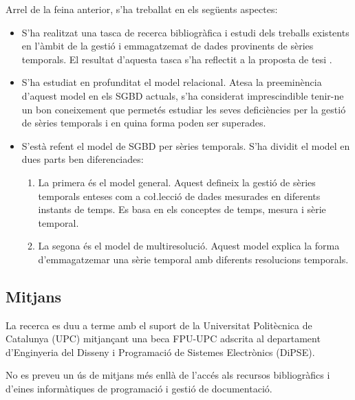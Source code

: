 Arrel de la feina anterior, s'ha treballat en els següents aspectes:
\begin{itemize}
\item S'ha realitzat una tasca de recerca bibliogràfica i estudi dels
  treballs existents en l'àmbit de la gestió i emmagatzemat de dades
  provinents de sèries temporals. El resultat d'aquesta tasca s'ha
  reflectit a la proposta de tesi \parencite{llusa12:ptd}.
\item S'ha estudiat en profunditat el model relacional. Atesa la
  preeminència d'aquest model en els SGBD actuals, s'ha considerat
  imprescindible tenir-ne un bon coneixement que permetés estudiar les
  seves deficiències per la gestió de sèries temporals i en quina
  forma poden ser superades.
\item S'està refent el model de SGBD per sèries temporals.  S'ha
  dividit el model en dues parts ben diferenciades:
  \begin{enumerate}
  \item La primera és el model general. Aquest defineix la gestió de
    sèries temporals enteses com a co\l.lecció de dades mesurades en
    diferents instants de temps. Es basa en els conceptes de temps,
    mesura i sèrie temporal.
  \item La segona és el model de multiresolució. Aquest model explica
    la forma d'emmagatzemar una sèrie temporal amb diferents
    resolucions temporals.
  \end{enumerate}
\end{itemize}





\subsection*{Mitjans}

La recerca es duu a terme amb el suport de la Universitat Politècnica
de Catalunya (UPC) mitjançant una beca FPU-UPC adscrita al departament
d'Enginyeria del Disseny i Programació de Sistemes Electrònics
(DiPSE).

No es preveu un ús de mitjans més enllà de l'accés als
recursos bibliogràfics i d'eines informàtiques de programació i
gestió de documentació.



